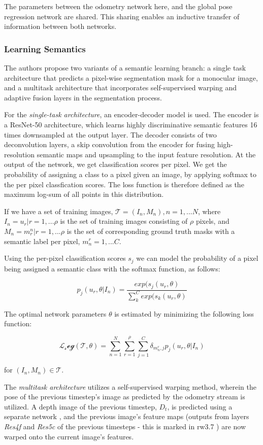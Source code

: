 The parameters between the odometry network here, and the global pose regression network are shared. This sharing enables an inductive transfer of information between
both networks. 

\subsubsection{Learning Semantics}
The authors propose two variants of a semantic learning branch: a single task architecture that predicts a pixel-wise segmentation mask for a monocular image, 
and a multitask architecture that incorporates self-supervised warping and adaptive fusion layers in the segmentation process. 


For the \emph{single-task architecture}, an encoder-decoder model is used. The encoder is a ResNet-50 architecture, which learns highly discriminative semantic features
16 times downsampled at the output layer. The decoder consists of two deconvolution layers, a skip convolution from the encoder for fusing high-resolution semantic maps
and upsampling to the input feature resolution. At the output of the network, we get classification scores per pixel. We get the probability of assigning a class to 
a pixel given an image, by applying softmax to the per pixel classfication scores. The loss function is therefore defined as the maximum log-sum of all points in this distribution. 


If we have a set of training images, $\mathcal{T} = {(I_n, M_n), n = 1,...N}$, where $I_n = {u_r | r = 1,...\rho}$ is the set of training images consisting of $\rho$ pixels, and $M_n = {m^n_r | r = 1,...\rho}$ is the set of corresponding ground truth masks with a semantic label per pixel, $m_n^r = {1,...C}$.

Using the per-pixel classification scores $s_j$ we can model the probability of a pixel being assigned a semantic class with the softmax function, as follows:

\[p_j(u_r, \theta | I_n) = \frac{exp(s_j(u_r, \theta)}{\sum_{k}^{C}exp(s_k(u_r, \theta)}\]

The optimal network parameters $\theta$ is estimated by minimizing the following loss function:

\[\mathcal{L_seg}(\mathcal{T}, \theta) = \sum_{n=1}^{N}\sum_{r=1}^{\rho}\sum_{j=1}^{C} \delta_{m_n^r, j}p_j(u_r, \theta | I_n)\]

for $(I_n, M_n) \in \mathcal{T}$.

The \emph{multitask architecture} utilizes a self-supervised warping method, wherein the pose of the previous timestep's image as predicted by the odometry stream is utilized.
A depth image of the previous timestep, $D_t$, is predicted using a separate network \cite{Mayer2016}, and the previous image's feature maps (outputs from layers \emph{Res4f} and \emph{Res5c} of the previous timesteps - this is marked in \figurename{rw3.7} ) are now warped onto the current
image's features. 


